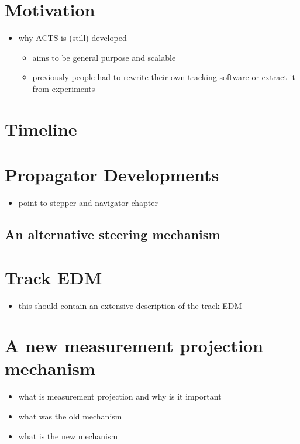 \section{Motivation}

\begin{itemize}
    \color{red}
    \item why ACTS is (still) developed
    \begin{itemize}
        \item aims to be general purpose and scalable
        \item previously people had to rewrite their own tracking software or extract it from experiments
    \end{itemize}
\end{itemize}

\section{Timeline}

\section{Propagator Developments}

\begin{itemize}
    \color{red}
    \item point to stepper and navigator chapter
\end{itemize}

\subsection{An alternative steering mechanism}

\section{Track EDM}

\begin{itemize}
    \color{red}
    \item this should contain an extensive description of the track EDM
\end{itemize}

\section{A new measurement projection mechanism}

\begin{itemize}
    \color{red}
    \item what is measurement projection and why is it important
    \item what was the old mechanism
    \item what is the new mechanism
\end{itemize}

